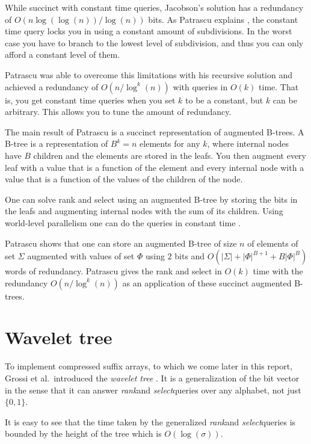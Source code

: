 \documentclass[11pt]{article}
\newcommand{\bigo}{O}
\newcommand{\rank}{\textit{rank}}
\newcommand{\select}{\textit{select}}
\begin{document}
While succinct with constant time queries, Jacobson's solution has a
redundancy of $\bigo(n \log(\log(n)) / \log(n))$ bits. As Patrascu
explains \cite{patrascu08}, the constant time query locks you in using
a constant amount of subdivisions. In the worst case you have to
branch to the lowest level of subdivision, and thus you can only
afford a constant level of them.

Patrascu was able to overcome this limitations with his recursive
solution \cite{patrascu08} and achieved a redundancy of $\bigo(n /
\log^k(n))$ with queries in $\bigo(k)$ time. That is, you get constant
time queries when you set $k$ to be a constant, but $k$ can be
arbitrary. This allows you to tune the amount of redundancy.

The main result of Patrascu is a succinct representation of
augmented B-trees. A B-tree is a representation of $B^k = n$ elements
for any $k$, where internal nodes have $B$ children and the elements
are stored in the leafs. You then augment every leaf with a value that
is a function of the element and every internal node with a value that
is a function of the values of the children of the node.

One can solve rank and select using an augmented B-tree
\cite{patrascu08} by storing the bits in the leafs and augmenting
internal nodes with the sum of its children. Using world-level
parallelism one can do the queries in constant time \cite{patrascu08}.

Patrascu shows \cite{patrascu08} that one can store an augmented
B-tree of size $n$ of elements of set $\Sigma$ augmented with values
of set $\Phi$ using $2$ bits and $\bigo(|\Sigma| + |\Phi|^{B+1} +
B|\Phi|^B)$ words of redundancy. Patrascu gives the rank and select in
$\bigo(k)$ time with the redundancy $\bigo(n / \log^k(n))$ as an
application of these succinct augmented B-trees.

\section{Wavelet tree}

To implement compressed suffix arrays, to which we come later in this
report, Grossi et al.\ introduced the \emph{wavelet tree}
\cite{grossi03}. It is a generalization of the bit vector in the sense
that it can answer \rank and \select queries over any alphabet, not
just $\{0, 1\}$.

It is easy to see that the time taken by the generalized \rank and
\select queries is bounded by the height of the tree which is
$\bigo(\log(\sigma))$.
\end{document}
